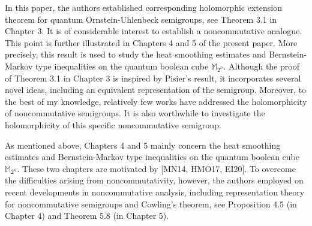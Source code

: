 \documentclass[a4paper, 11pt]{article}
\begin{document}
In this paper, the authors established corresponding holomorphic extension theorem for quantum Ornstein-Uhlenbeck semigroups, see Theorem 3.1 in Chapter 3. It is of considerable interest to establish a noncommutative analogue. This point is further illustrated in Chapters 4 and 5 of the present paper. More precisely, this result is used to study the heat smoothing estimates and  Bernstein-Markov type inequalities on the quantum boolean cube $\mathbb{M}_{2^n}$. Although the proof of Theorem 3.1 in Chapter 3 is  inspired by Pisier's result, it incorporates several novel ideas, including an equivalent representation of the semigroup. Moreover, to the best of my knowledge, relatively few works have addressed the holomorphicity of noncommutative semigroups. It is also worthwhile to investigate the holomorphicity of this specific noncommutative semigroup.  

 As mentioned above, Chapters 4 and 5 mainly concern the heat smoothing estimates and  Bernstein-Markov type inequalities on the quantum boolean cube $\mathbb{M}_{2^n}$. These two chapters are motivated by [MN14, HMO17, EI20]. To overcome the difficulties arising from noncommutativity, however, the authors employed on recent developments in noncommutative analysis, including representation theory for noncommutative semigroups and Cowling’s theorem, see Proposition 4.5 (in Chapter 4) and Theorem 5.8 (in Chapter 5). 
 
  \medskip
 
\end{document}
